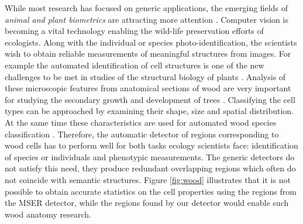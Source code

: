 \documentclass[conference,compsoc]{IEEEtran}
\begin{document}
While most research has focused on generic applications, the emerging fields of {\em animal and plant biometrics} are attracting more attention \cite{Kuehl2013, leafsnap_eccv2012}. Computer vision is becoming a vital technology enabling the wild-life preservation efforts of ecologists. Along with the individual or species photo-identification, the scientists wish to obtain reliable measurements of meaningful structures from images. For example the automated identification of cell structures is one of the new challenges to be met in studies of the structural biology of plants \cite{Quelhas2011}. Analysis of these microscopic features from anatomical sections of wood are very important for studying the secondary growth and development of trees \cite{Brunel2014}. Classifying the cell types can be approached by examining their shape, size and spatial distribution. At the same time these characteristics are used for automated wood species classification \cite{Gasson2011}. Therefore, the  automatic detector of regions corresponding to wood cells has to perform well for both tasks ecology scientists face: identification of species or individuals and phenotypic measurements. The generic detectors do not satisfy this need, they produce redundant overlapping regions which often do not coincide with semantic structures. Figure \ref{fig:wood} illustrates that it is not possible to obtain accurate statistics on the cell properties using the regions from the MSER  detector, while the regions found by our detector would enable such wood anatomy research.  
\end{document}
